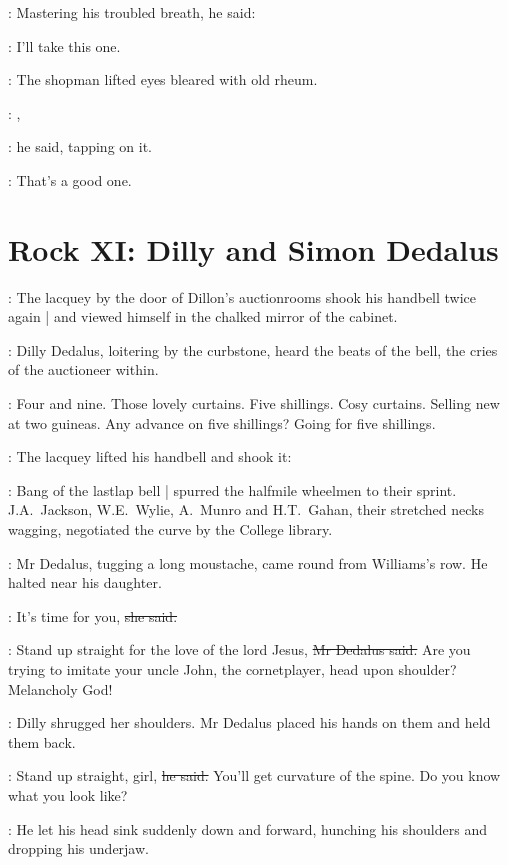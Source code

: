 :
Mastering his troubled breath,
he said:

\Bloom:
I'll take this one.

:
The shopman lifted eyes
bleared with old rheum.

\shopman:
,

:
he said,
tapping on it.

\shopman:
That's a good one.


\section*{Rock XI: Dilly and Simon Dedalus}


:
The lacquey by the door of Dillon's auctionrooms
shook his handbell
twice again |
and viewed himself in the chalked mirror of the cabinet.

:
Dilly Dedalus,
loitering by the curbstone,
heard the beats of the bell,
the cries of the auctioneer within.

\auctioneer:
Four and nine.
Those lovely curtains.
Five shillings.
Cosy curtains.
Selling new at two guineas.
Any advance on five shillings?
Going for five shillings.

:
The lacquey lifted his handbell and shook it:

%

\begin{mdframed}
    :
    Bang of the lastlap bell |
    spurred the halfmile wheelmen to their sprint.
    J.A.~Jackson,
    W.E.~Wylie,
    A.~Munro
    and H.T.~Gahan,
    their stretched necks wagging,
    negotiated the curve by the College library.
\end{mdframed}

:
Mr Dedalus,
tugging a long moustache,
came round from Williams's row.
He halted near his daughter.

\dilly:
It's time for you,
\sout{she said.}

\simon:
Stand up straight for the love of the lord Jesus,
\sout{Mr Dedalus said.}
Are you trying to imitate your uncle John,
the cornetplayer,
head upon shoulder?
Melancholy God!

:
Dilly shrugged her shoulders.
Mr Dedalus placed his hands on them
and held them back.

\simon:
Stand up straight, girl,
\sout{he said.}
You'll get curvature of the spine.
Do you know what you look like?

:
He let his head sink suddenly down and forward,
hunching his shoulders and dropping his underjaw.


